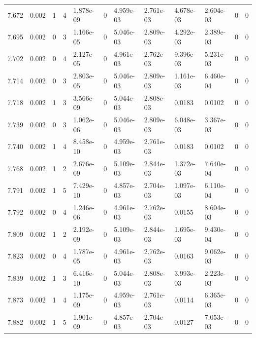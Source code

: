 \documentclass[preview]{standalone}
\begin{document}
{{{{{{{{{{\begin{tabular}{L{1.2cm}C{1.2cm} C{0.3cm}C{0.5cm} C{1.4cm}C{1.4cm} C{1.4cm}C{1.4cm} C{1.6cm}C{1.6cm} C{1.6cm}C{1.6cm}}
  7.672  &  0.002  & 1     &  4 &  1.878e-09  & 0  &  4.959e-03&   2.761e-03& 4.678e-03 & 2.604e-03   &  0 & 0  \\ 
  7.695  &  0.002  & 0     &  3 &  1.166e-05  & 0  &  5.046e-03&   2.809e-03& 4.292e-03 & 2.389e-03   &  0 & 0  \\ 
  7.702  &  0.002  & 0     &  4 &  2.127e-05  & 0  &  4.961e-03&   2.762e-03& 9.396e-03 & 5.231e-03   &  0 & 0  \\ 
  7.714  &  0.002  & 0     &  3 &  2.803e-05  & 0  &  5.046e-03&   2.809e-03& 1.161e-03 & 6.460e-04   &  0 & 0  \\ 
  7.718  &  0.002  & 1     &  3 &  3.566e-09  & 0  &  5.044e-03&   2.808e-03& 0.0183 & 0.0102   &  0 & 0  \\ 
  7.739  &  0.002  & 0     &  3 &  1.062e-06  & 0  &  5.046e-03&   2.809e-03& 6.048e-03 & 3.367e-03   &  0 & 0  \\ 
  7.740  &  0.002  & 1     &  4 &  8.458e-10  & 0  &  4.959e-03&   2.761e-03& 0.0183 & 0.0102   &  0 & 0  \\ 
  7.768  &  0.002  & 1     &  2 &  2.676e-09  & 0  &  5.109e-03&   2.844e-03& 1.372e-03 & 7.640e-04   &  0 & 0  \\ 
  7.791  &  0.002  & 1     &  5 &  7.429e-10  & 0  &  4.857e-03&   2.704e-03& 1.097e-03 & 6.110e-04   &  0 & 0  \\ 
  7.792  &  0.002  & 0     &  4 &  1.246e-06  & 0  &  4.961e-03&   2.762e-03& 0.0155 & 8.604e-03   &  0 & 0  \\ 
  7.809  &  0.002  & 1     &  2 &  2.192e-09  & 0  &  5.109e-03&   2.844e-03& 1.695e-03 & 9.430e-04   &  0 & 0  \\ 
  7.823  &  0.002  & 0     &  4 &  1.787e-05  & 0  &  4.961e-03&   2.762e-03& 0.0163 & 9.062e-03   &  0 & 0  \\ 
  7.839  &  0.002  & 1     &  3 &  6.416e-10  & 0  &  5.044e-03&   2.808e-03& 3.993e-03 & 2.223e-03   &  0 & 0  \\ 
  7.873  &  0.002  & 1     &  4 &  1.175e-09  & 0  &  4.959e-03&   2.761e-03& 0.0114 & 6.365e-03   &  0 & 0  \\ 
  7.882  &  0.002  & 1     &  5 &  1.901e-09  & 0  &  4.857e-03&   2.704e-03& 0.0127 & 7.053e-03   &  0 & 0  \\ 
\hline 
\end{tabular} 

}}}}}}}}}}
\end{document}
